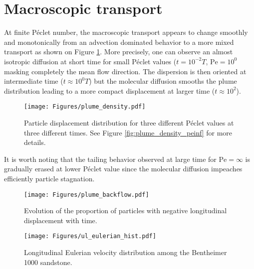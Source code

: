 \section{Macroscopic transport}
At finite Péclet number, the macroscopic transport appears to change smoothly and monotonically from an advection dominated behavior to a more mixed transport as shown on Figure \ref{fig:plume_density}.
More precisely, one can observe an almost isotropic diffusion at short time for small Péclet values ($t=10^{-2}T$, $\mathrm{Pe} = 10^0$ masking completely the mean flow direction. 
The dispersion is then oriented at intermediate time ($t\approx 10^0T$) but the molecular diffusion smooths the plume distribution leading to a more compact displacement at larger time ($t\approx 10^2$).
\begin{figure}[h!]
	\centering
	\texttt{[image: Figures/plume\_density.pdf]}
	\caption{Particle displacement distribution for three different Péclet values at three different times. See Figure \ref{fig:plume_density_peinf} for more details.}
	\label{fig:plume_density}
\end{figure}
It is worth noting that the tailing behavior observed at large time for $\mathrm{Pe}=\infty$ is gradually erased at lower Péclet value since the molecular diffusion impeaches efficiently particle stagnation.\\

\begin{figure}
	\centering
	\begin{minipage}{.49\textwidth}
		\centering
		\texttt{[image: Figures/plume\_backflow.pdf]}
		\caption{Evolution of the proportion of particles with negative longitudinal displacement with time.}
		\label{fig:backflow}
	\end{minipage}%
	\begin{minipage}{.49\textwidth}
		\centering
		\texttt{[image: Figures/ul\_eulerian\_hist.pdf]}
		\caption{Longitudinal Eulerian velocity distribution among the Bentheimer 1000 sandstone.}
		\label{fig:ul_eulerian_hist}
	\end{minipage}
\end{figure}

